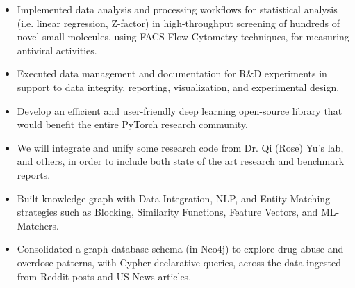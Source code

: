\documentclass[10pt,a4paper]{altacv}
\begin{document}
\medskip




\begin{itemize}
    \item   \small{Implemented data analysis and processing workflows for statistical analysis (i.e. linear regression, Z-factor) in high-throughput screening of hundreds of novel small-molecules, using FACS Flow Cytometry techniques, for measuring antiviral activities.}
    \item   \small{Executed data management and documentation for R\&D experiments in support to data integrity, reporting, visualization, and experimental design.}
    
\end{itemize}

\medskip





\begin{itemize}
  \item \small Develop an efficient and user-friendly deep learning open-source library that would benefit the entire PyTorch research community.
    \item \small We will integrate and unify some research code from Dr. Qi (Rose) Yu's lab, and others, in order to include both state of the art research and benchmark reports. 
\end{itemize}

\medskip




\begin{itemize}
  \item \small Built knowledge graph with Data Integration, NLP, and Entity-Matching strategies such as Blocking, Similarity Functions, Feature Vectors, and ML-Matchers.
    \item \small Consolidated a graph database schema (in Neo4j) to explore drug abuse and overdose patterns, with Cypher declarative queries, across the data ingested from Reddit posts and US News articles. 
\end{itemize}
\end{document}
